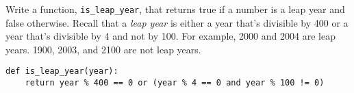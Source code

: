 \begin{blocksection}
\question Write a function, \lstinline$is_leap_year$, that returns true if a number is a leap year and false otherwise.
Recall that a \emph{leap year} is either a year that's divisible by 400 or a year that's divisible by 4 and not by 100.
For example, 2000 and 2004 are leap years. 1900, 2003, and 2100 are not leap years.

\begin{solution}[1.5in]
\begin{lstlisting}
def is_leap_year(year):
    return year % 400 == 0 or (year % 4 == 0 and year % 100 != 0) 
\end{lstlisting}
\end{solution}
\end{blocksection}
